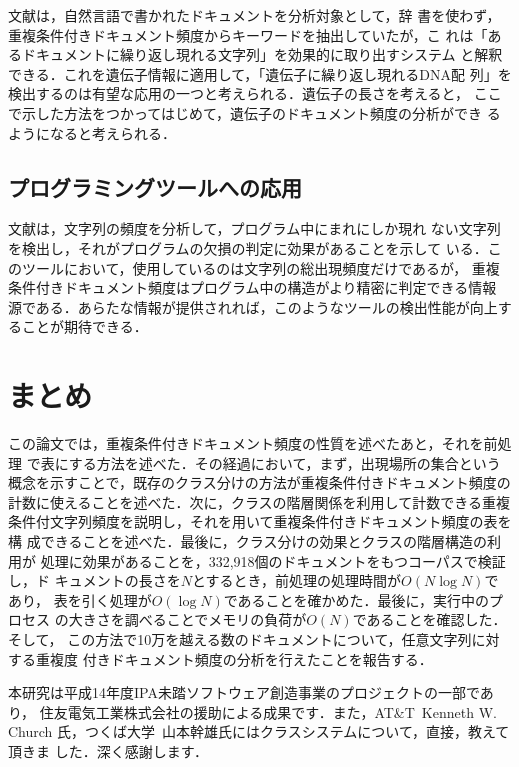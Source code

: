 文献\cite{Keyword}は，自然言語で書かれたドキュメントを分析対象として，辞
書を使わず，重複条件付きドキュメント頻度からキーワードを抽出していたが，こ
れは「あるドキュメントに繰り返し現れる文字列」を効果的に取り出すシステム
と解釈できる．これを遺伝子情報に適用して，「遺伝子に繰り返し現れるDNA配
列」を検出するのは有望な応用の一つと考えられる．遺伝子の長さを考えると，
ここで示した方法をつかってはじめて，遺伝子のドキュメント頻度の分析ができ
るようになると考えられる．

\subsection{プログラミングツールへの応用}

文献\cite{TOOL}は，文字列の頻度を分析して，プログラム中にまれにしか現れ
ない文字列を検出し，それがプログラムの欠損の判定に効果があることを示して
いる．このツールにおいて，使用しているのは文字列の総出現頻度だけであるが，
重複条件付きドキュメント頻度はプログラム中の構造がより精密に判定できる情報
源である．あらたな情報が提供されれば，このようなツールの検出性能が向上す
ることが期待できる．

\section{まとめ}

この論文では，重複条件付きドキュメント頻度の性質を述べたあと，それを前処理
で表にする方法を述べた．その経過において，まず，出現場所の集合という
概念を示すことで，既存のクラス分けの方法が重複条件付きドキュメント頻度の
計数に使えることを述べた．次に，クラスの階層関係を利用して計数できる重複
条件付文字列頻度を説明し，それを用いて重複条件付きドキュメント頻度の表を構
成できることを述べた．最後に，クラス分けの効果とクラスの階層構造の利用が
処理に効果があることを，332,918個のドキュメントをもつコーパスで検証し，ド
キュメントの長さを$N$とするとき，前処理の処理時間が$O(N \log N)$であり，
表を引く処理が$O(\log N)$であることを確かめた．最後に，実行中のプロセス
の大きさを調べることでメモリの負荷が$O(N)$であることを確認した．そして，
この方法で10万を越える数のドキュメントについて，任意文字列に対する重複度
付きドキュメント頻度の分析を行えたことを報告する．

\acknowledgment
本研究は平成14年度IPA未踏ソフトウェア創造事業のプロジェクトの一部であり，
住友電気工業株式会社の援助による成果です．また，AT\&T\ Kenneth W. Church
氏，つくば大学\ 山本幹雄氏にはクラスシステムについて，直接，教えて頂きま
した．深く感謝します．



